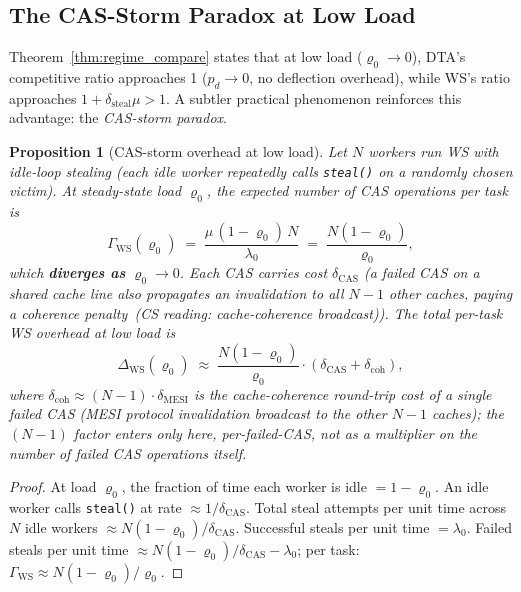 \documentclass[11pt,a4paper]{report}
\newtheorem{proposition}[theorem]{Proposition}
\newcommand{\physics}[2]{#1\ \textnormal{(\emph{CS reading}: #2)}}
\begin{document}
\subsection{The CAS-Storm Paradox at Low Load}
\label{subsec:cas_storm}

Theorem~\ref{thm:regime_compare} states that at low load ($\varrho_0 \to 0$),
DTA's competitive ratio approaches 1 ($p_d \to 0$, no deflection overhead),
while WS's ratio approaches $1 + \delta_{\mathrm{steal}}\mu > 1$.
A subtler practical phenomenon reinforces this advantage: the
\emph{CAS-storm paradox}.

\begin{proposition}[CAS-storm overhead at low load]\label{prop:cas_storm}
Let $N$ workers run WS with idle-loop stealing (each idle worker repeatedly
calls \texttt{steal()} on a randomly chosen victim).
At steady-state load $\varrho_0$, the expected number of CAS operations
per task is
\begin{equation}\label{eq:cas_per_task}
  \Gamma_{\mathrm{WS}}(\varrho_0)
  \;=\;
  \frac{\mu\,(1-\varrho_0)\,N}{\lambda_0}
  \;=\;
  \frac{N(1-\varrho_0)}{\varrho_0},
\end{equation}
which \textbf{diverges as} $\varrho_0 \to 0$.  Each CAS carries cost
$\delta_{\mathrm{CAS}}$ (a failed CAS on a shared cache line also
propagates an invalidation to all $N-1$ other caches, paying a
\physics{coherence penalty}{cache-coherence broadcast}).
The total per-task WS overhead at low load is
\begin{equation}\label{eq:ws_low_load_overhead}
  \Delta_{\mathrm{WS}}(\varrho_0)
  \;\approx\;
  \frac{N(1-\varrho_0)}{\varrho_0} \cdot (\delta_{\mathrm{CAS}} + \delta_{\mathrm{coh}}),
\end{equation}
where $\delta_{\mathrm{coh}} \approx (N-1)\cdot\delta_{\mathrm{MESI}}$ is
the cache-coherence round-trip cost of a single failed CAS (MESI protocol
invalidation broadcast to the other $N-1$ caches); the $(N-1)$ factor
enters only here, per-failed-CAS, not as a multiplier on the number of
failed CAS operations itself.
\end{proposition}

\begin{proof}
At load $\varrho_0$, the fraction of time each worker is idle $= 1-\varrho_0$.
An idle worker calls \texttt{steal()} at rate $\approx 1/\delta_{\mathrm{CAS}}$.
Total steal attempts per unit time across $N$ idle workers $\approx N(1-\varrho_0)/\delta_{\mathrm{CAS}}$.
Successful steals per unit time $= \lambda_0$.
Failed steals per unit time $\approx N(1-\varrho_0)/\delta_{\mathrm{CAS}} - \lambda_0$;
per task: $\Gamma_{\mathrm{WS}} \approx N(1-\varrho_0)/\varrho_0$.
\end{proof}
\end{document}
